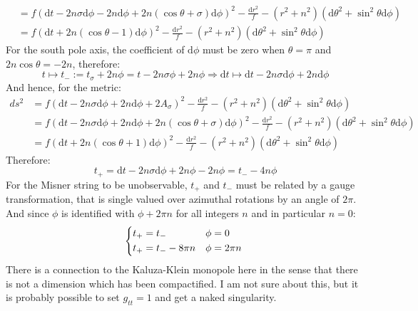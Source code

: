 \documentclass[12pt,a4]{article}
\newcommand{\e}{\mathrm{d}}
\begin{document}
\begin{enumerate}
\begin{enumerate}
\begin{align*}
               &= f(\e t - 2 n \sigma \e \phi - 2 n \e \phi + 2n (\cos \theta + \sigma) \e \phi)^2 - \frac{\e r^2}{f} - (r^2 + n^2)(\e \theta^2 + \sin^2 \theta \e \phi)\\
               &= f(\e t + 2n (\cos \theta - 1) \e \phi)^2 - \frac{\e r^2}{f} - (r^2 + n^2)(\e \theta^2 + \sin^2 \theta \e \phi)
        \end{align*}
        For the south pole axis, the coefficient of $\e \phi$ must be zero when $\theta = \pi$ and $2n \cos \theta = - 2n$, therefore:
        \begin{equation*}
          t \mapsto t_- := t_\sigma + 2n \phi = t - 2 n \sigma \phi + 2n \phi \Rightarrow \e t \mapsto \e t - 2 n \sigma \e \phi + 2 n \e \phi
        \end{equation*}
        And hence, for the metric:
        \begin{align*}
          ds^2 &= f(\e t - 2 n \sigma \e \phi + 2 n \e \phi + 2 A_\sigma)^2 - \frac{\e r^2}{f} - (r^2 + n^2)(\e \theta^2 + \sin^2 \theta \e \phi)\\
               &= f(\e t - 2 n \sigma \e \phi + 2 n \e \phi + 2n (\cos \theta + \sigma) \e \phi)^2 - \frac{\e r^2}{f} - (r^2 + n^2)(\e \theta^2 + \sin^2 \theta \e \phi)\\
               &= f(\e t + 2n (\cos \theta + 1) \e \phi)^2 - \frac{\e r^2}{f} - (r^2 + n^2)(\e \theta^2 + \sin^2 \theta \e \phi)
        \end{align*}
        Therefore:
        \begin{equation*}
          t_+ = \e t - 2 n \sigma \e \phi + 2 n \phi - 2 n \phi = t_- - 4n \phi
        \end{equation*}
        For the Misner string to be unobservable, $t_+$ and $t_-$ must be related by a gauge transformation, that is single valued over azimuthal rotations by an angle of $2 \pi$.
        And since $\phi$ is identified with $\phi + 2 \pi n$ for all integers $n$ and in particular $n = 0$:
        \begin{align*}
          \begin{cases*}
            t_+ = t_- & $\phi = 0$\\
            t_+ = t_- - 8 \pi n & $\phi = 2 \pi n$
          \end{cases*}
        \end{align*}
        There is a connection to the Kaluza-Klein monopole here in the sense that there is not a dimension which has been compactified.
        I am not sure about this, but it is probably possible to set $g_{tt} = 1$ and get a naked singularity.


\end{enumerate}
\end{enumerate}
\end{document}
